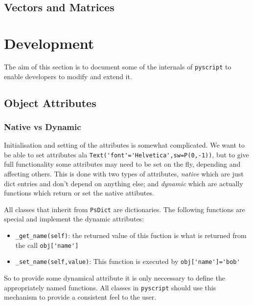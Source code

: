 \documentclass[a4paper]{book}
\begin{document}
\section{Vectors and Matrices}

\chapter{Development}

The aim of this section is to document some of the internals of
\Verb|pyscript| to enable developers to modify and extend it.

\section{Object Attributes}
\label{sec:attributes}


\subsection{Native vs Dynamic}
\label{sec:native-vs-dynamic}

Initialisation and setting of the attributes is somewhat complicated.  We
want to be able to set attributes ala
\Verb|Text('font'='Helvetica',sw=P(0,-1))|, but to give full functionality
some attributes may need to be set on the fly, depending and affecting
others.  This is done with two types of attributes, \emph{native} which are
just dict entries and don't depend on anything else; and \emph{dynamic}
which are actually functions which return or set the native attibutes.

All classes that inherit from \Verb|PsDict| are dictionaries. 
The following functions are special and implement the dynamic attributes:
\begin{itemize}
\item \Verb|_get_name(self)|: the returned value of this fuction is what is
  returned from the call \Verb|obj['name']|
\item \Verb|_set_name(self,value)|: This function is executed by
  \Verb|obj['name']='bob'|

\end{itemize}
So to provide some dynamical attribute it is only neccessary to define 
the appropriately named functions. All classes in \Verb|pyscript|
should use this mechanism to provide a consistent feel to the user.
\end{document}
